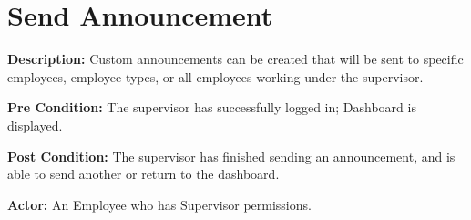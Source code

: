 \documentclass[letterpaper,12pt]{report}
\begin{document}



\pagebreak
\section{Send Announcement}
\begin{description}
 \item \textbf{Description:} \newline Custom announcements can be created that will be sent to specific employees, employee types, or all employees working under the supervisor.
 \item \textbf{Pre Condition:} \newline The supervisor has successfully logged in; Dashboard is displayed.
 \item \textbf{Post Condition:} \newline The supervisor has finished sending an announcement, and is able to send another or return to the dashboard.
 \item \textbf{Actor:} \newline An Employee who has Supervisor permissions.
\end{description}
\end{document}
